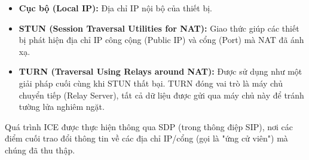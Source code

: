 \begin{itemize}
    \item \textbf{Cục bộ (Local IP):} Địa chỉ IP nội bộ của thiết bị.
    \item \textbf{STUN (Session Traversal Utilities for NAT):} Giao thức giúp các thiết bị phát hiện địa chỉ IP công cộng (Public IP) và cổng (Port) mà NAT đã ánh xạ.
    \item \textbf{TURN (Traversal Using Relays around NAT):} Được sử dụng như một giải pháp cuối cùng khi STUN thất bại. TURN đóng vai trò là máy chủ chuyển tiếp (Relay Server), tất cả dữ liệu được gửi qua máy chủ này để tránh tường lửa nghiêm ngặt.
\end{itemize}

Quá trình ICE được thực hiện thông qua SDP (trong thông điệp SIP), nơi các điểm cuối trao đổi thông tin về các địa chỉ IP/cổng (gọi là "ứng cử viên") mà chúng đã thu thập.

